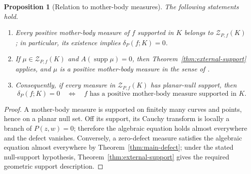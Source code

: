 \documentclass[reqno]{amsart}
\newtheorem{proposition}[theorem]{Proposition}
\theoremstyle{definition}
\theoremstyle{remark}
\newcommand{\supp}{\operatorname{supp}}
\begin{document}
\begin{proposition}[Relation to mother-body measures]
\label{prop:motherbody-relation}
The following statements hold.
\begin{enumerate}[label=\textup{(\roman*)}]
\item Every positive mother-body measure of $f$ supported in $K$ belongs to
$\mathcal Z_{P,f}(K)$; in particular, its existence implies
$\delta_P(f;K)=0$.
\item If $\mu\in\mathcal Z_{P,f}(K)$ and $A(\supp\mu)=0$, then
Theorem~\ref{thm:external-support} applies, and $\mu$ is a positive mother-body
measure in the sense of \cite{BoSh}.
\item Consequently, if every measure in $\mathcal Z_{P,f}(K)$ has planar-null
support, then
\begin{equation}\label{eq:conditional-equivalence}
 \delta_P(f;K)=0
 \quad\Longleftrightarrow\quad
 f\text{ has a positive mother-body measure supported in }K.
\end{equation}
\end{enumerate}
\end{proposition}

\begin{proof}
A mother-body measure is supported on finitely many curves and points, hence on
a planar null set.  Off its support, its Cauchy transform is locally a branch
of $P(z,w)=0$; therefore the algebraic equation holds almost everywhere and the
defect vanishes.  Conversely, a zero-defect measure satisfies the algebraic
equation almost everywhere by Theorem~\ref{thm:main-defect}; under the stated
null-support hypothesis, Theorem~\ref{thm:external-support} gives the required
geometric support description.
\end{proof}
\end{document}

